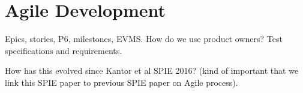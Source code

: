 \section{Agile Development}

Epics, stories, P6, milestones, EVMS.\label{sec:jira_ticket}
How do we use product owners?
Test specifications and requirements.

How has this evolved since Kantor et al SPIE 2016\cite{2016SPIE.9911E..0NK}? (kind of important that we link this SPIE paper to previous SPIE paper on Agile process).
